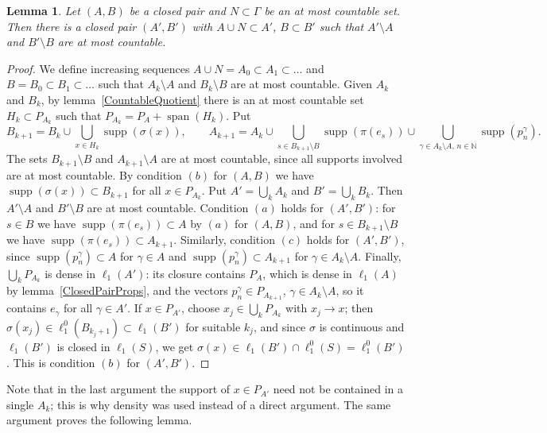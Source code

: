 \documentclass[12pt]{article}
\newtheorem{lemma}[theorem]{Lemma}
\newcommand{\lo}[1]{\ell_1^0(#1)}
\newcommand{\ellone}[1]{\ell_1(#1)}
\newcommand{\supp}{\operatorname{supp}}
\newcommand{\Lin}{\operatorname{span}}
\begin{document}
\begin{lemma}\label{CountableClosingOff} Let $(A,B)$ be a closed pair and
    $N\subset\Gamma$ be an at most countable set. Then there is a closed pair
    $(A',B')$ with $A\cup N\subset A'$, $B\subset B'$ such that
    $A'\setminus A$ and $B'\setminus B$ are at most countable.
\end{lemma}
\begin{proof} We define increasing sequences $A\cup N=A_0\subset A_1\subset\ldots$
    and $B=B_0\subset B_1\subset\ldots$ such that $A_k\setminus A$ and
    $B_k\setminus B$ are at most countable. Given $A_k$ and $B_k$, by
    lemma~\ref{CountableQuotient} there is an at most countable set
    $H_k\subset P_{A_k}$ such that $P_{A_k}=P_A+\Lin(H_k)$. Put
    \[
    B_{k+1}=B_k\cup\bigcup_{x\in H_k}\supp(\sigma(x)),\qquad
    A_{k+1}=A_k\cup\bigcup_{s\in B_{k+1}\setminus B}\supp(\pi(e_s))
    \cup\bigcup_{\gamma\in A_k\setminus A,\,n\in\mathbb{N}}\supp(p^\gamma_n).
    \]
    The sets $B_{k+1}\setminus B$ and $A_{k+1}\setminus A$ are at most
    countable, since all supports involved are at most countable. By
    condition $(b)$ for $(A,B)$ we have $\supp(\sigma(x))\subset B_{k+1}$ for
    all $x\in P_{A_k}$. Put $A'=\bigcup_k A_k$ and $B'=\bigcup_k B_k$. Then
    $A'\setminus A$ and $B'\setminus B$ are at most countable. Condition
    $(a)$ holds for $(A',B')$: for $s\in B$ we have $\supp(\pi(e_s))\subset A$
    by $(a)$ for $(A,B)$, and for $s\in B_{k+1}\setminus B$ we have
    $\supp(\pi(e_s))\subset A_{k+1}$. Similarly, condition $(c)$ holds for
    $(A',B')$, since $\supp(p^\gamma_n)\subset A$ for $\gamma\in A$ and
    $\supp(p^\gamma_n)\subset A_{k+1}$ for $\gamma\in A_k\setminus A$.
    Finally, $\bigcup_k P_{A_k}$ is dense in $\ellone{A'}$: its closure
    contains $P_A$, which is dense in $\ellone{A}$ by
    lemma~\ref{ClosedPairProps}, and the vectors $p^\gamma_n\in P_{A_{k+1}}$,
    $\gamma\in A_k\setminus A$, so it contains $e_\gamma$ for all
    $\gamma\in A'$. If $x\in P_{A'}$, choose $x_j\in\bigcup_k P_{A_k}$ with
    $x_j\to x$; then $\sigma(x_j)\in\lo{B_{k_j+1}}\subset\ellone{B'}$ for
    suitable $k_j$, and since $\sigma$ is continuous and $\ellone{B'}$ is
    closed in $\ellone{S}$, we get $\sigma(x)\in\ellone{B'}\cap\lo{S}=\lo{B'}$.
    This is condition $(b)$ for $(A',B')$.
\end{proof}

Note that in the last argument the support of $x\in P_{A'}$ need not be
contained in a single $A_k$; this is why density was used instead of a
direct argument. The same argument proves the following lemma.
\end{document}
